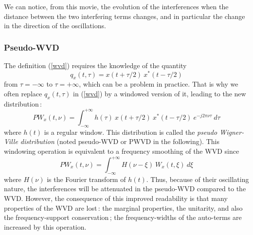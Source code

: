 We can notice, from this movie, the evolution of the interferences
when the distance between the two interfering terms changes, and in
particular the change in the direction of the oscillations.

\subsubsection{Pseudo-WVD}
\label{PWVD}
  The definition (\ref{wvd}) requires the knowledge of the quantity
\[q_x(t,\tau)=x(t+\tau/2)\ x^*(t-\tau/2)\] from $\tau=-\infty$ to
$\tau=+\infty$, which can be a problem in practice. That is why we often
replace $q_x(t,\tau)$ in (\ref{wvd}) by a windowed version of it, leading
to the new distribution\,:
\[PW_x(t,\nu)=\int_{-\infty}^{+\infty} h(\tau)\ x(t+\tau/2)\ x^*(t-\tau/2)\
e^{-j2\pi \nu \tau}\ d\tau\] where $h(t)$ is a regular window. This
distribution is called the {\it pseudo Wigner-Ville distribution} (noted
pseudo-WVD or PWVD in the following). This windowing operation is
equivalent to a frequency smoothing of the WVD since
\[PW_x(t,\nu) = \int_{-\infty}^{+\infty} H(\nu-\xi)\ W_x(t,\xi)\ d\xi\]
where $H(\nu)$ is the Fourier transform of $h(t)$. Thus, because of their
oscillating nature, the interferences will be attenuated in the pseudo-WVD
compared to the WVD. However, the consequence of this improved readability
is that many properties of the WVD are lost\,: the marginal properties, the
unitarity, and also the frequency-support conservation\,; the
frequency-widths of the auto-terms are increased by this operation.\\

